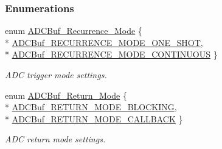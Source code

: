 \subsubsection*{Enumerations}
\begin{DoxyCompactItemize}
\item 
enum \hyperlink{_a_d_c_buf_8h_af15cc4961b02af48216132c2b8bc88f1}{A\+D\+C\+Buf\+\_\+\+Recurrence\+\_\+\+Mode} \{ \\*
\hyperlink{_a_d_c_buf_8h_af15cc4961b02af48216132c2b8bc88f1a1916212b661aa853b7a581e3e5dc35e2}{A\+D\+C\+Buf\+\_\+\+R\+E\+C\+U\+R\+R\+E\+N\+C\+E\+\_\+\+M\+O\+D\+E\+\_\+\+O\+N\+E\+\_\+\+S\+H\+O\+T}, 
\\*
\hyperlink{_a_d_c_buf_8h_af15cc4961b02af48216132c2b8bc88f1ac10945188f88ddadd4322c4e117d5b3c}{A\+D\+C\+Buf\+\_\+\+R\+E\+C\+U\+R\+R\+E\+N\+C\+E\+\_\+\+M\+O\+D\+E\+\_\+\+C\+O\+N\+T\+I\+N\+U\+O\+U\+S}
 \}
\begin{DoxyCompactList}\small\item\em A\+D\+C trigger mode settings. \end{DoxyCompactList}\item 
enum \hyperlink{_a_d_c_buf_8h_a3d643e8024503c5ef2679c83419ba6ee}{A\+D\+C\+Buf\+\_\+\+Return\+\_\+\+Mode} \{ \\*
\hyperlink{_a_d_c_buf_8h_a3d643e8024503c5ef2679c83419ba6eea5c6236b2f629b196d7874175be679399}{A\+D\+C\+Buf\+\_\+\+R\+E\+T\+U\+R\+N\+\_\+\+M\+O\+D\+E\+\_\+\+B\+L\+O\+C\+K\+I\+N\+G}, 
\\*
\hyperlink{_a_d_c_buf_8h_a3d643e8024503c5ef2679c83419ba6eea633b4b063b88d7c62e9e2513075a36a7}{A\+D\+C\+Buf\+\_\+\+R\+E\+T\+U\+R\+N\+\_\+\+M\+O\+D\+E\+\_\+\+C\+A\+L\+L\+B\+A\+C\+K}
 \}
\begin{DoxyCompactList}\small\item\em A\+D\+C return mode settings. \end{DoxyCompactList}\end{DoxyCompactItemize}
